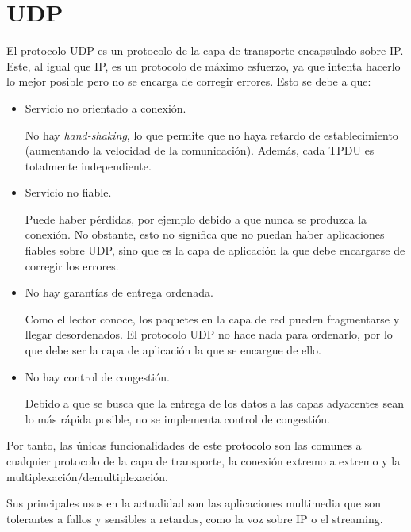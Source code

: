 \section{\acrfull{UDP}}
El protocolo \acrshort{UDP} es un protocolo de la capa de transporte encapsulado sobre \acrshort{IP}.
Este, al igual que \acrshort{IP}, es un protocolo de máximo esfuerzo, ya que intenta hacerlo lo mejor posible pero no se encarga de corregir errores. Esto se debe a que:
\begin{itemize}
    \item Servicio no orientado a conexión.
    
    No hay \textit{hand-shaking}, lo que permite que no haya retardo de establecimiento (aumentando la velocidad de la comunicación). Además, cada \acrshort{TPDU} es totalmente independiente.

    \item Servicio no fiable.
    
    Puede haber pérdidas, por ejemplo debido a que nunca se produzca la conexión. No obstante, esto no significa que no puedan haber aplicaciones fiables sobre \acrshort{UDP}, sino que es la capa de aplicación la que debe encargarse de corregir los errores.

    \item No hay garantías de entrega ordenada.
    
    Como el lector conoce, los paquetes en la capa de red pueden fragmentarse y llegar desordenados. El protocolo \acrshort{UDP} no hace nada para ordenarlo, por lo que debe ser la capa de aplicación la que se encargue de ello.

    \item No hay control de congestión.
    
    Debido a que se busca que la entrega de los datos a las capas adyacentes sean lo más rápida posible, no se implementa control de congestión.
\end{itemize}

Por tanto, las únicas funcionalidades de este protocolo son las comunes a cualquier protocolo de la capa de transporte, la conexión extremo a extremo y la multiplexación/demultiplexación.

Sus principales usos en la actualidad son las aplicaciones multimedia que son tolerantes a fallos y sensibles a retardos, como la voz sobre IP o el streaming.

